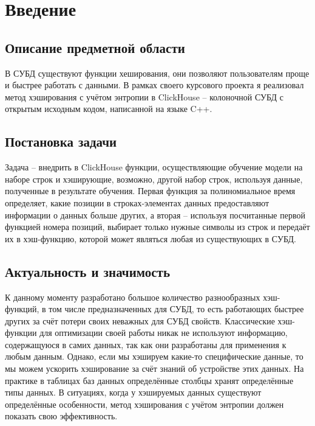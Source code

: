\documentclass[a4paper,12pt]{extarticle}
\begin{document}
\begin{sloppypar}

\section{Введение}
\subsection{Описание предметной области}

В СУБД существуют функции хеширования, они позволяют пользователям проще и быстрее работать с данными. В рамках своего курсового проекта я реализовал метод хэширования с учётом энтропии в ClickHouse -- колоночной СУБД с открытым исходным кодом, написанной на языке C++.

\subsection{Постановка задачи}

Задача -- внедрить в ClickHouse функции, осуществляющие обучение модели на наборе строк и хэширующие, возможно, другой набор строк, используя данные, полученные в результате обучения. Первая функция за полиномиальное время определяет, какие позиции в строках-элементах данных предоставляют информации о данных больше других, а вторая -- используя посчитанные первой функцией номера позиций, выбирает только нужные символы из строк и передаёт их в хэш-функцию, которой может являться любая из существующих в СУБД.

\subsection{Актуальность и значимость}

К данному моменту разработано большое количество разнообразных хэш-функций, в том числе предназначенных для СУБД, то есть работающих быстрее других за счёт потери своих неважных для СУБД свойств. Классические хэш-функции для оптимизации своей работы никак не используют информацию, содержащуюся в самих данных, так как они разработаны для применения к любым данным. Однако, если мы хэшируем какие-то специфические данные, то мы можем ускорить хэширование за счёт знаний об устройстве этих данных. На практике в таблицах баз данных определённые столбцы хранят определённые типы данных. В ситуациях, когда у хэшируемых данных существуют определённые особенности, метод хэширования с учётом энтропии должен показать свою эффективность.


\end{sloppypar}
\end{document}
